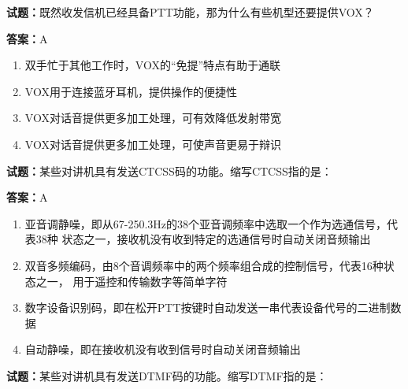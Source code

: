 \documentclass{ctexbook}
\begin{document}
\vspace{1em}

\textbf{试题：}既然收发信机已经具备PTT功能，那为什么有些机型还要提供VOX？ 

\textbf{答案：}A 

\begin{enumerate}[leftmargin=3em]
  \item 双手忙于其他工作时，VOX的“免提”特点有助于通联 

  \item VOX用于连接蓝牙耳机，提供操作的便捷性 

  \item VOX对话音提供更多加工处理，可有效降低发射带宽 

  \item VOX对话音提供更多加工处理，可使声音更易于辩识 

\end{enumerate}





\vspace{1em}

\textbf{试题：}某些对讲机具有发送CTCSS码的功能。缩写CTCSS指的是： 

\textbf{答案：}A 


\begin{enumerate}[leftmargin=3em]
  \item 亚音调静噪，即从67-250.3Hz的38个亚音调频率中选取一个作为选通信号，代表38种
状态之一，接收机没有收到特定的选通信号时自动关闭音频输出 

  \item 双音多频编码，由8个音调频率中的两个频率组合成的控制信号，代表16种状态之一，
用于遥控和传输数字等简单字符 

  \item 数字设备识别码，即在松开PTT按键时自动发送一串代表设备代号的二进制数据 

  \item 自动静噪，即在接收机没有收到信号时自动关闭音频输出 

\end{enumerate}





\vspace{1em}

\textbf{试题：}某些对讲机具有发送DTMF码的功能。缩写DTMF指的是： 
\end{document}
